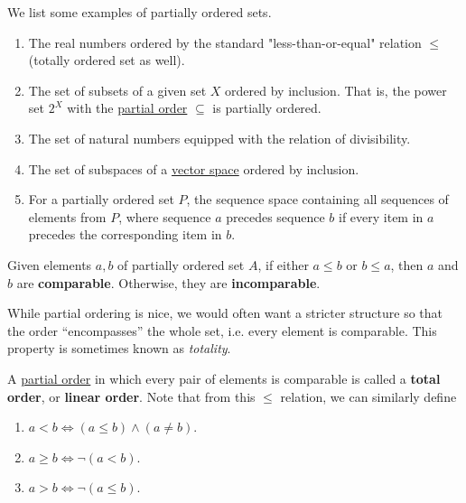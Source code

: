   \begin{example}
    \label{ex:partially-ordered-sets}
    We list some examples of partially ordered sets. 
    \begin{enumerate}
      \item The real numbers ordered by the standard "less-than-or-equal" relation $\leq$ (totally ordered set as well). 
      \item The set of subsets of a given set $X$ ordered by inclusion. That is, the power set $2^X$ with the \hyperref[def:partial-order]{partial order} $\subseteq$ is partially ordered. 
      \item The set of natural numbers equipped with the relation of divisibility. 
      \item The set of subspaces of a \hyperref[alg-def:vector-space]{vector space} ordered by inclusion. 
      \item For a partially ordered set $P$, the sequence space containing all sequences of elements from $P$, where sequence $a$ precedes sequence $b$ if every item in $a$ precedes the corresponding item in $b$. 
    \end{enumerate}
  \end{example} 

  \begin{definition}
    \label{def:comparable-elements}
    Given elements $a, b$ of partially ordered set $A$, if either $a \leq b$ or $b \leq a$, then $a$ and $b$ are \textbf{comparable}. Otherwise, they are \textbf{incomparable}. 
  \end{definition}

  While partial ordering is nice, we would often want a stricter structure so that the order ``encompasses'' the whole set, i.e. every element is comparable. This property is sometimes known as \textit{totality}. 

  \begin{definition}
    \label{def:total-order}
    A \hyperref[def:partial-order]{partial order} in which every pair of elements is comparable is called a \textbf{total order}, or \textbf{linear order}. Note that from this $\leq$ relation, we can similarly define 
    \begin{enumerate}
      \item $a < b \iff (a \leq b) \land (a \neq b)$. 
      \item $a \geq b \iff \neg(a < b)$. 
      \item $a > b \iff \neg(a \leq b)$. 
    \end{enumerate} 
  \end{definition}

